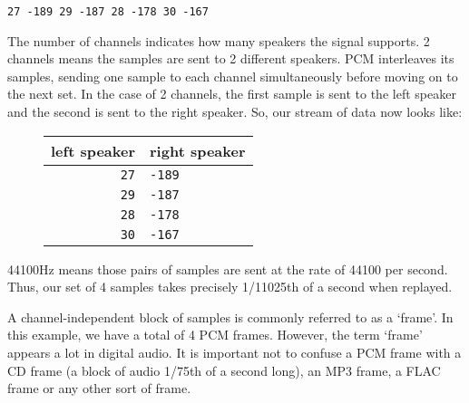 \begin{Verbatim}[frame=single]
27 -189 29 -187 28 -178 30 -167
\end{Verbatim}

The number of channels indicates how many speakers the signal
supports.
2 channels means the samples are sent to 2 different speakers.
PCM interleaves its samples, sending one sample to
each channel simultaneously before moving on to the next set.
In the case of 2 channels, the first sample is sent to the
left speaker and the second is sent to the right speaker.
So, our stream of data now looks like:

\begin{figure}[h]
\begin{tabular}{| r | l |}
\hline
left speaker & right speaker \\
\hline
\texttt{27} & \texttt{-189} \\
\texttt{29} & \texttt{-187} \\
\texttt{28} & \texttt{-178} \\
\texttt{30} & \texttt{-167} \\
\hline
\end{tabular}
\end{figure}

\noindent
44100Hz means those pairs of samples are sent at the rate of
44100 per second.
Thus, our set of 4 samples takes precisely 1/11025th of a second
when replayed.

A channel-independent block of samples is commonly referred to
as a `frame'.
In this example, we have a total of 4 PCM frames.
However, the term `frame' appears a lot in digital audio.
It is important not to confuse a PCM frame with a CD frame
(a block of audio 1/75th of a second long), an MP3 frame,
a FLAC frame or any other sort of frame.

\clearpage

